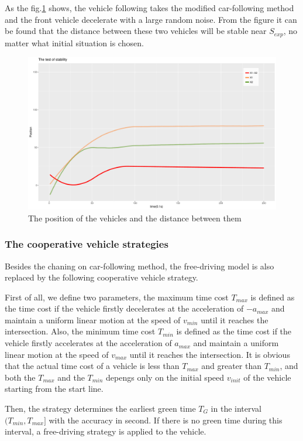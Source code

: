 \documentclass[a4paper]{paper}
\begin{document}
As the fig.\ref{carf} shows, the vehicle following takes the modified car-following method and the front vehicle decelerate with a large random noise. From the figure it can be found that the distance between these two vehicles will be stable near $S_{exp}$, no matter what initial situation is chosen.
\begin{figure}
\centering
\includegraphics[width=\textwidth]{NearlyGoDie_2.pdf}
\caption{The position of the vehicles and the distance between them}
\label{carf}
\end{figure}
\subsubsection{The cooperative vehicle strategies}
\label{section:tgs}
Besides the chaning on car-following method, the free-driving model is also replaced by the following cooperative vehicle strategy. 

First of all, we define two parameters, the maximum time cost $T_{max}$ is defined as the time cost if the vehicle firstly decelerates at the acceleration of $-a_{max}$ and maintain a uniform linear motion at the speed of $v_{min}$ until it reaches the intersection. Also, the minimum time cost $T_{min}$ is defined as the time cost if the vehicle firstly accelerates at the acceleration of $a_{max}$ and maintain a uniform linear motion at the speed of $v_{max}$ until it reaches the intersection. It is obvious that the actual time cost of a vehicle is less than $T_{max}$ and greater than $T_{min}$, and both the $T_{max}$ and the $T_{min}$ depengs only on the initial speed $v_{init}$ of the vehicle starting from the start line.

Then, the strategy determines the earliest green time $T_G$ in the interval $(T_{min},T_{max}]$ with the accuracy in second. If there is no green time during this interval, a free-driving strategy is applied to the vehicle.
\end{document}
